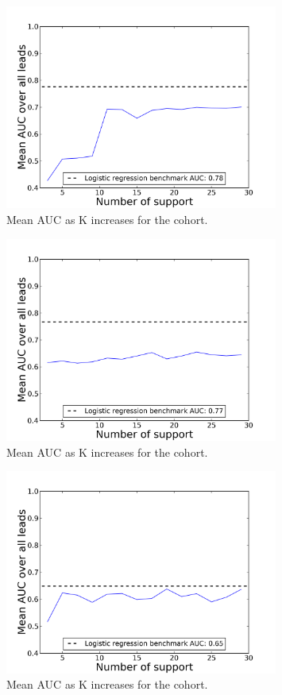 \begin{figure}[ht!]
  \caption{Mean AUC as K increases for the \neither cohort.}\label{fig:hmm_support_over_time_no_collab}
  \centering
    \includegraphics[width=0.8\textwidth]{figures/hmm/no_collab_support_over_time.png}
\end{figure}

\begin{figure}[ht!]
  \caption{Mean AUC as K increases for the \forum cohort.}\label{fig:hmm_support_over_time_forum_only}
  \centering
    \includegraphics[width=0.8\textwidth]{figures/hmm/forum_only_support_over_time.png}
\end{figure}

\begin{figure}[ht!]
  \caption{Mean AUC as K increases for the \both cohort.}\label{fig:hmm_support_over_time_forum_and_wiki}
  \centering
    \includegraphics[width=0.8\textwidth]{figures/hmm/forum_and_wiki_support_over_time.png}
\end{figure}

